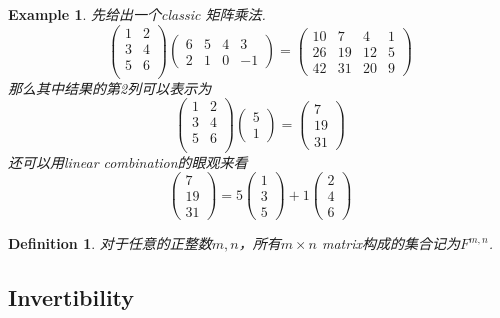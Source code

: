 \documentclass{article}
\newtheorem{example}[theorem]{Example}
\newtheorem{definition}[theorem]{Definition}
\begin{document}
\begin{example}
\rm 先给出一个classic 矩阵乘法.
$$
\begin{pmatrix}
1 & 2 \\
3 & 4 \\
5 & 6 \\
\end{pmatrix}
\begin{pmatrix}
6 & 5 & 4 & 3 \\
2 & 1 & 0 & -1
\end{pmatrix} = 
\begin{pmatrix}
10 & 7 & 4 & 1 \\
26 & 19 & 12 & 5 \\
42 & 31 & 20 & 9
\end{pmatrix}
$$
那么其中结果的第2列可以表示为
$$
\begin{pmatrix}
1 & 2 \\
3 & 4 \\
5 & 6 \\
\end{pmatrix}
\begin{pmatrix}
5 \\
1 
\end{pmatrix} = 
\begin{pmatrix}
7 \\
19 \\
31 
\end{pmatrix}
$$
还可以用linear combination的眼观来看
$$
\begin{pmatrix}
7 \\
19 \\
31 
\end{pmatrix} =
5\begin{pmatrix}
1 \\
3 \\
5 
\end{pmatrix} + 
1 \begin{pmatrix}
2 \\
4 \\
6
\end{pmatrix}
$$
\end{example}

\begin{definition}
对于任意的正整数$m,n$，所有$m \times n$ matrix构成的集合记为$F^{m,n}$.
\end{definition}

\newpage
\subsection{Invertibility}
\end{document}
